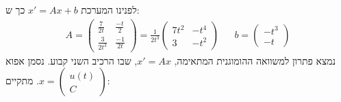 \documentclass{article}
\begin{document}
לפנינו המערכת $x'=Ax+b$ כך ש:
\begin{align*}
    A=\begin{pmatrix}
          \frac{7}{2t}   & \frac{-t}{2}  \\
          \frac{3}{2t^3} & \frac{-1}{2t}
      \end{pmatrix}=\frac{1}{2t^3}\begin{pmatrix}
                                      7t^2 & -t^4 \\
                                      3    & -t^2
                                  \end{pmatrix} &  & b=\begin{pmatrix}
                                                           -t^3 \\
                                                           -t
                                                       \end{pmatrix}
\end{align*}
נמצא פתרון למשוואה ההומוגנית המתאימה, $x'=Ax$, שבו הרכיב השני קבוע. נסמן אפוא $x=\begin{pmatrix}
        u(t) \\
        C
    \end{pmatrix}$. מתקיים:
\end{document}
